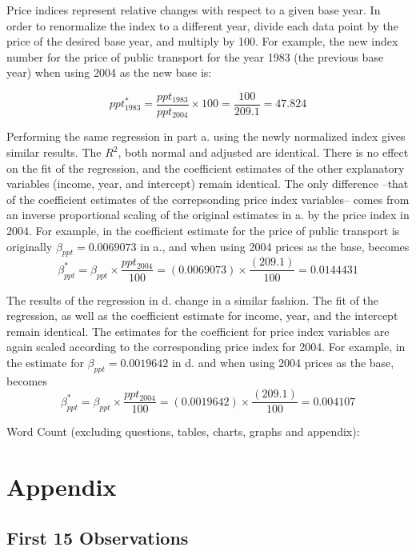\documentclass{article}
\begin{document}
\begin{enumerate}[label=\alph*.]
Price indices represent relative changes with respect to a given base year. In order to renormalize the index to a different year, divide each data point by the price of the desired base year, and multiply by 100. For example, the new index number for the price of public transport for the year 1983 (the previous base year) when using 2004 as the new base is:

$$ ppt_{1983}^* = \frac{ppt_{1983}}{ppt_{2004}}\times 100 = \frac{100}{209.1} = 47.824$$

Performing the same regression in part a. using the newly normalized index gives similar results. The $R^2$, both normal and adjusted are identical. There is no effect on the fit of the regression, and the coefficient estimates of the other explanatory variables (income, year, and intercept) remain identical. The only difference --that of the coefficient estimates of the correpsonding price index variables-- comes from an inverse proportional scaling of the original estimates in a. by the price index in 2004.	 For example, in the coefficient estimate for the price of public transport is originally $\beta_{ppt} = 0.0069073 $ in a., and when using 2004 prices as the base, becomes
$$\beta_{ppt}^* = \beta_{ppt} \times  \frac{ppt_{2004}}{100} = (0.0069073) \times \frac{(209.1)}{100} = 0.0144431 $$ 

The results of the regression in d. change in a similar fashion. The fit of the regression, as well as the coefficient estimate for income, year, and the intercept remain identical. The estimates for the coefficient for price index variables are again scaled according to the corresponding price index for 2004. For example, in the estimate for $\beta_{ppt} = 0.0019642$ in d. and when using 2004 prices as the base, becomes 
$$\beta_{ppt}^* = \beta_{ppt} \times \frac{ppt_{2004}}{100} = (0.0019642) \times \frac{(209.1)}{100} = 0.004107$$   



\end{enumerate}


Word Count (excluding questions, tables, charts, graphs and appendix): 






\newpage
\section{Appendix}
\subsection*{First 15 Observations}
\end{document}
